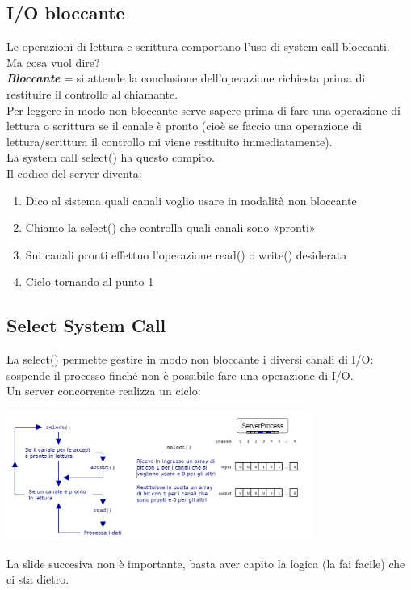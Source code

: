 
\subsection{I/O bloccante}
Le operazioni di lettura e scrittura comportano l'uso di system call bloccanti.
\\Ma cosa vuol dire?
\\\textbf{\textit{Bloccante}} = si attende la conclusione dell'operazione richiesta prima di restituire il controllo al chiamante.
\\Per leggere in modo non bloccante serve sapere prima di fare una operazione di lettura o scrittura se il canale è pronto (cioè se faccio una operazione di lettura/scrittura il controllo mi viene restituito immediatamente).
\\La system call select() ha questo compito.
\\Il codice del server diventa:
\begin{enumerate}
    \item Dico al sistema quali canali voglio usare in modalità non bloccante
    \item Chiamo la select() che controlla quali canali sono «pronti»
    \item Sui canali pronti effettuo l'operazione read() o write() desiderata
    \item Ciclo tornando al punto 1
\end{enumerate}

\subsection{Select System Call}
La select() permette gestire in modo non bloccante i diversi canali di I/O: sospende il processo finché non è possibile fare una operazione di I/O.
\\Un server concorrente realizza un ciclo:
\begin{center}
    \includegraphics[width=0.75\textwidth]{img/SelectSystemCall1.jpg}
\end{center}
La slide succesiva non è importante, basta aver capito la logica (la fai facile) che ci sta dietro.

